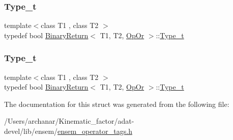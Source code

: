 \mbox{\label{structBinaryReturn_3_01T1_00_01T2_00_01OpOr_01_4_a1680bdb61ac9ebe2b2be3fb7de1329b4}} 
\subsubsection{\texorpdfstring{Type\_t}{Type\_t}\hspace{0.1cm}{\footnotesize\ttfamily [2/3]}}
{\footnotesize\ttfamily template$<$class T1 , class T2 $>$ \\
typedef bool \mbox{\hyperlink{structBinaryReturn}{Binary\+Return}}$<$ T1, T2, \mbox{\hyperlink{structOpOr}{Op\+Or}} $>$\+::\mbox{\hyperlink{structBinaryReturn_3_01T1_00_01T2_00_01OpOr_01_4_a1680bdb61ac9ebe2b2be3fb7de1329b4}{Type\+\_\+t}}}

\mbox{\label{structBinaryReturn_3_01T1_00_01T2_00_01OpOr_01_4_a1680bdb61ac9ebe2b2be3fb7de1329b4}} 
\subsubsection{\texorpdfstring{Type\_t}{Type\_t}\hspace{0.1cm}{\footnotesize\ttfamily [3/3]}}
{\footnotesize\ttfamily template$<$class T1 , class T2 $>$ \\
typedef bool \mbox{\hyperlink{structBinaryReturn}{Binary\+Return}}$<$ T1, T2, \mbox{\hyperlink{structOpOr}{Op\+Or}} $>$\+::\mbox{\hyperlink{structBinaryReturn_3_01T1_00_01T2_00_01OpOr_01_4_a1680bdb61ac9ebe2b2be3fb7de1329b4}{Type\+\_\+t}}}



The documentation for this struct was generated from the following file\+:\begin{DoxyCompactItemize}
\item 
/\+Users/archanar/\+Kinematic\+\_\+factor/adat-\/devel/lib/ensem/\mbox{\hyperlink{adat-devel_2lib_2ensem_2ensem__operator__tags_8h}{ensem\+\_\+operator\+\_\+tags.\+h}}\end{DoxyCompactItemize}
